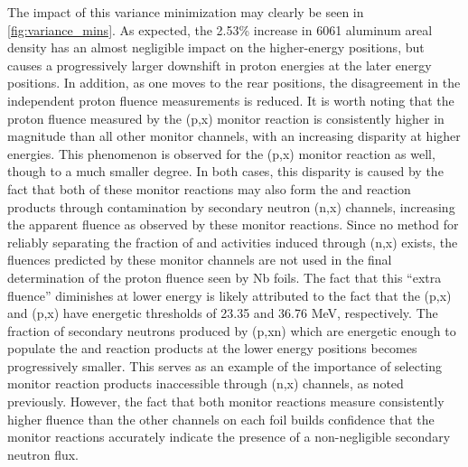 \documentclass[3p]{elsarticle}
\begin{document}
The impact of this variance minimization may  clearly be seen in   \autoref{fig:variance_mins}.
As expected, the 2.53\% increase in 6061 aluminum areal density has an almost negligible impact on the higher-energy positions, but causes a progressively larger downshift  in proton energies at the later energy positions.
In addition, as one moves to the rear  positions, the disagreement in the independent proton fluence measurements is reduced.
It is worth noting that the proton fluence measured by the (p,x) monitor reaction is consistently higher in magnitude than all other monitor channels, with an increasing disparity at higher energies.
This phenomenon is observed for the (p,x) monitor reaction as well, though to a much smaller degree.
In both cases, this disparity is caused by the fact that both of these monitor reactions may also form the  and  reaction products through contamination by secondary neutron (n,x) channels, increasing the apparent fluence as observed by these monitor reactions.
Since no method for reliably separating the fraction of  and  activities induced through (n,x) exists, the fluences predicted by these monitor channels are not used in the final determination of the proton fluence seen by Nb foils. 
The fact that this \enquote{extra fluence} diminishes at lower energy is likely attributed to the fact that the (p,x) and (p,x) have energetic thresholds of 23.35 and 36.76 MeV, respectively. 
The fraction of secondary neutrons produced by (p,xn)  which are energetic enough to populate the   and  reaction products at the lower energy positions becomes progressively smaller.
This serves as an example of the importance of selecting monitor reaction products inaccessible through (n,x) channels, as noted previously.
However,  the fact that both monitor reactions measure consistently higher fluence than the other channels on each foil builds confidence that the monitor reactions accurately indicate the presence of a non-negligible secondary neutron flux.
\end{document}
